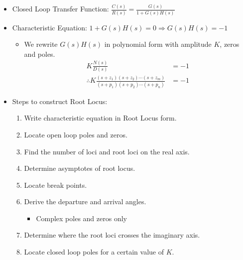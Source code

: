 \documentclass[a4paper]{article}
\begin{document}
\begin{center}
\end{center}

\begin{itemize}
    \item Closed Loop Transfer Function: \quad$\displaystyle\frac{C(s)}{R(s)} = \frac{G(s)}{1+G(s)H(s)}$
    \item Characteristic Equation: \quad$1+G(s)H(s) = 0$\qquad$\Rightarrow G(s)H(s) = -1$
    \begin{itemize}[label=$\circ$]
        \item We rewrite $G(s)H(s)$ in polynomial form with amplitude $K$, zeros and poles.
        \begin{align*}
            K\frac{N(s)}{D(s)} &= -1\\
            \therefore K\frac{(s+z_1)(s+z_2)\cdots(s+z_m)}{(s+p_1)(s+p_2)\cdots(s+p_n)} &= -1
        \end{align*}
    \end{itemize}
    \item Steps to construct Root Locus:
    \begin{enumerate}
        \item Write characteristic equation in Root Locus form.
        \item Locate open loop poles and zeros.
        \item Find the number of loci and root loci on the real axis.
        \item Determine asymptotes of root locus.
        \item Locate break points.
        \item Derive the departure and arrival angles.
        \begin{itemize}[label=$\circ$]
            \item Complex poles and zeros only
        \end{itemize}
        \item Determine where the root loci crosses the imaginary axis.
        \item Locate closed loop poles for a certain value of $K$.
    \end{enumerate}
\end{itemize}
\end{document}
